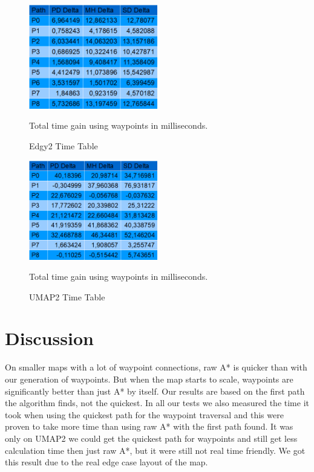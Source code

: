 \documentclass[a4paper]{article}
\begin{document}
\begin{figure}[h!]
\centering
\includegraphics[width=0.5\textwidth,height=\textheight,keepaspectratio]{ChartsAndFigures/Edgy2_timeTable.png}
\caption{Edgy2 Time Table}
Total time gain using waypoints in milliseconds.
\label{fig:Edgy2_cd}
\end{figure}
\begin{figure}[h!]
\centering
\includegraphics[width=0.5\textwidth,height=\textheight,keepaspectratio]{ChartsAndFigures/UMAP2_timeTable.png}
\caption{UMAP2 Time Table}
Total time gain using waypoints in milliseconds.
\label{fig:UMAP2_cd}
\end{figure}

\section{Discussion}
On smaller maps with a lot of waypoint connections, raw A* is quicker than with our generation of waypoints. But when the map starts to scale, waypoints are significantly better than just A* by itself.
Our results are based on the first path the algorithm finds, not the quickest. In all our tests we also measured the time it took when using the quickest path for the waypoint traversal and this were proven to take more time than using raw A* with the first path found. It was only on UMAP2 we could get the quickest path for waypoints and still get less calculation time then just raw A*, but it were still not real time friendly. We got this result due to the real edge case layout of the map.
	
\end{document}
